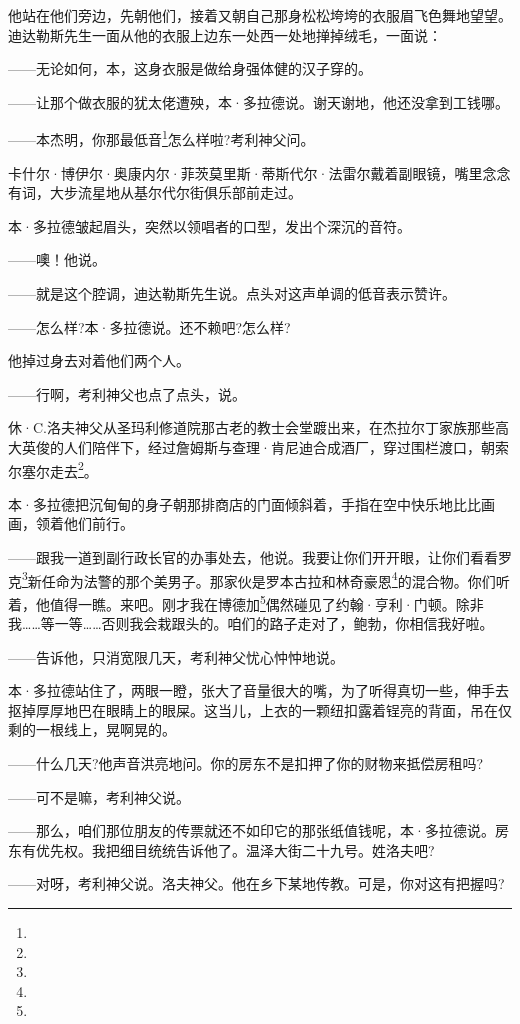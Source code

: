 \par 他站在他们旁边，先朝他们，接着又朝自己那身松松垮垮的衣服眉飞色舞地望望。迪达勒斯先生一面从他的衣服上边东一处西一处地掸掉绒毛，一面说：
\par ——无论如何，本，这身衣服是做给身强体健的汉子穿的。
\par ——让那个做衣服的犹太佬遭殃，本·多拉德说。谢天谢地，他还没拿到工钱哪。
\par ——本杰明，你那最低音\footnote{}怎么样啦?考利神父问。
\par 卡什尔·博伊尔·奥康内尔·菲茨莫里斯·蒂斯代尔·法雷尔戴着副眼镜，嘴里念念有词，大步流星地从基尔代尔街俱乐部前走过。
\par 本·多拉德皱起眉头，突然以领唱者的口型，发出个深沉的音符。
\par ——噢！他说。
\par ——就是这个腔调，迪达勒斯先生说。点头对这声单调的低音表示赞许。
\par ——怎么样?本·多拉德说。还不赖吧?怎么样?
\par 他掉过身去对着他们两个人。
\par ——行啊，考利神父也点了点头，说。
\par 休·C.洛夫神父从圣玛利修道院那古老的教士会堂踱出来，在杰拉尔丁家族那些高大英俊的人们陪伴下，经过詹姆斯与查理·肯尼迪合成酒厂，穿过围栏渡口，朝索尔塞尔走去\footnote{}。
\par 本·多拉德把沉甸甸的身子朝那排商店的门面倾斜着，手指在空中快乐地比比画画，领着他们前行。
\par ——跟我一道到副行政长官的办事处去，他说。我要让你们开开眼，让你们看看罗克\footnote{}新任命为法警的那个美男子。那家伙是罗本古拉和林奇豪恩\footnote{}的混合物。你们听着，他值得一瞧。来吧。刚才我在博德加\footnote{}偶然碰见了约翰·亨利·门顿。除非我……等一等……否则我会栽跟头的。咱们的路子走对了，鲍勃，你相信我好啦。
\par ——告诉他，只消宽限几天，考利神父忧心忡忡地说。
\par 本·多拉德站住了，两眼一瞪，张大了音量很大的嘴，为了听得真切一些，伸手去抠掉厚厚地巴在眼睛上的眼屎。这当儿，上衣的一颗纽扣露着锃亮的背面，吊在仅剩的一根线上，晃啊晃的。
\par ——什么几天?他声音洪亮地问。你的房东不是扣押了你的财物来抵偿房租吗?
\par ——可不是嘛，考利神父说。
\par ——那么，咱们那位朋友的传票就还不如印它的那张纸值钱呢，本·多拉德说。房东有优先权。我把细目统统告诉他了。温泽大街二十九号。姓洛夫吧?
\par ——对呀，考利神父说。洛夫神父。他在乡下某地传教。可是，你对这有把握吗?
